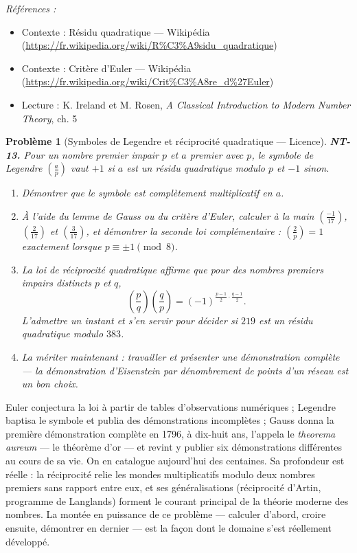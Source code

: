 \documentclass[11pt]{article}
\newtheorem{problem}{Problème}
\newenvironment{refs}{\par\small\noindent\emph{Références :}\begin{itemize}\setlength\itemsep{0pt}}{\end{itemize}\normalsize}
\begin{document}
\begin{refs}
\item Contexte : Résidu quadratique --- Wikipédia (\url{https://fr.wikipedia.org/wiki/R%C3%A9sidu_quadratique})
\item Contexte : Critère d'Euler --- Wikipédia (\url{https://fr.wikipedia.org/wiki/Crit%C3%A8re_d%27Euler})
\item Lecture : K. Ireland et M. Rosen, \textit{A Classical Introduction to Modern Number Theory}, ch. 5
\end{refs}

\bigskip

\begin{problem}[{Symboles de Legendre et réciprocité quadratique --- Licence}]
\textbf{NT-13.} Pour un nombre premier impair $p$ et $a$ premier avec $p$,
le symbole de Legendre $\left(\frac{a}{p}\right)$ vaut $+1$ si $a$ est un résidu
quadratique modulo $p$ et $-1$ sinon.
\begin{enumerate}
\item[(i)] Démontrer que le symbole est complètement
multiplicatif en $a$.
\item[(ii)] À l'aide du lemme de Gauss ou du critère d'Euler, calculer à la main
$\left(\frac{-1}{17}\right)$, $\left(\frac{2}{17}\right)$ et
$\left(\frac{3}{17}\right)$, et démontrer la seconde loi complémentaire :
$\left(\frac{2}{p}\right) = 1$ exactement lorsque $p \equiv \pm 1 \pmod 8$.
\item[(iii)] La loi
de réciprocité quadratique affirme que pour des nombres premiers impairs distincts $p$ et $q$,
\[ \left(\frac{p}{q}\right)\left(\frac{q}{p}\right) = (-1)^{\frac{p-1}{2}\cdot\frac{q-1}{2}}. \]
L'admettre un instant et s'en servir pour décider si $219$ est un résidu quadratique modulo
$383$.
\item[(iv)] La mériter maintenant : travailler et présenter une démonstration complète --- la
démonstration d'Eisenstein par dénombrement de points d'un réseau est un bon choix.
\end{enumerate}

\end{problem}

\noindent Euler conjectura la loi à partir de tables d'observations numériques ; Legendre
baptisa le symbole et publia des démonstrations incomplètes ; Gauss donna la première démonstration
complète en 1796, à dix-huit ans, l'appela le \textit{theorema aureum} --- le théorème d'or --- et revint y
publier six démonstrations différentes au cours de sa vie. On en catalogue aujourd'hui des
centaines. Sa profondeur est réelle : la réciprocité relie les mondes multiplicatifs modulo deux
nombres premiers sans rapport entre eux, et ses généralisations (réciprocité d'Artin, programme de
Langlands) forment le courant principal de la théorie moderne des nombres. La montée en puissance de
ce problème --- calculer d'abord, croire ensuite, démontrer en dernier --- est la façon dont le domaine
s'est réellement développé.
\end{document}
